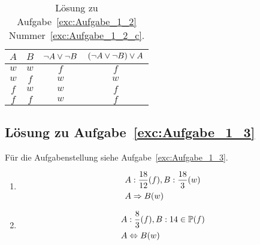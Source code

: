 \begin{enumerate}
\begin{table}[htb]
	\center
	\begin{tabular}{c|c||c|c}
	$A$ & $B$ & $\neg A \vee \neg B$ & $\left(\neg A \vee \neg B\right) \vee A$\\\hline
	$w$ & $w$ & $f$ & $f$\\
	$w$ & $f$ & $w$ & $w$\\
	$f$ & $w$ & $w$ & $f$\\
	$f$ & $f$ & $w$ & $f$\\
	\end{tabular}
	\caption{Lösung zu Aufgabe~\ref{exc:Aufgabe_1_2} Nummer~\ref{exc:Aufgabe_1_2_c}.}
	\label{loe:Aufgabe_1_2_c}
	\end{table}
\end{enumerate}

\subsection{Lösung zu Aufgabe~\ref{exc:Aufgabe_1_3}}
Für die Aufgabenstellung siehe Aufgabe~\vref{exc:Aufgabe_1_3}.
\label{loe:Aufgabe_1_3}
\begin{enumerate}
\item \begin{align*}
	&A: \frac{18}{12} (f), B: \frac{18}{3} (w)\\
	&A \Rightarrow B (w)
	\end{align*}

\item \begin{align*}
	&A: \frac{8}{3} (f), B: 14 \in \mathbb{P} (f)\\
	&A \Leftrightarrow B (w)
	\end{align*}
\end{enumerate}
